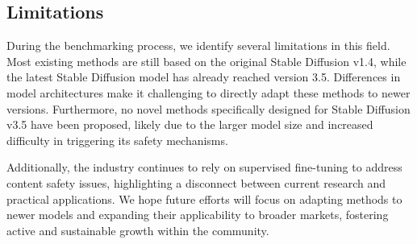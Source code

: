 \subsection{Limitations}
During the benchmarking process, we identify several limitations in this field. Most existing methods are still based on the original Stable Diffusion v1.4, while the latest Stable Diffusion model has already reached version 3.5. Differences in model architectures make it challenging to directly adapt these methods to newer versions. Furthermore, no novel methods specifically designed for Stable Diffusion v3.5 have been proposed, likely due to the larger model size and increased difficulty in triggering its safety mechanisms.

Additionally, the industry continues to rely on supervised fine-tuning to address content safety issues, highlighting a disconnect between current research and practical applications. We hope future efforts will focus on adapting methods to newer models and expanding their applicability to broader markets, fostering active and sustainable growth within the community.




